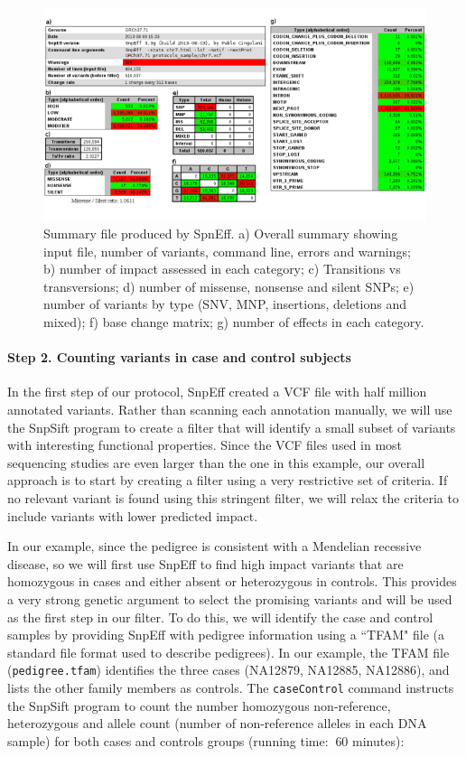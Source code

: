 \begin{figure}
    \centering
    \includegraphics[width=14cm]{snpeff_1.png}
    \caption{Summary file produced by SpnEff. a) Overall summary showing input file, number of variants, command line, errors and warnings; b) number of impact assessed in each category; c) Transitions vs transversions; d) number of missense, nonsense and silent SNPs; e) number of variants by type (SNV, MNP, insertions, deletions and mixed); f) base change matrix; g) number of effects in each category.}
    \label{fig:snpeff1}
\end{figure}

\paragraph{Step 2. Counting variants in case and control subjects} In the first step of our protocol, SnpEff created a VCF file with half million annotated variants. Rather than scanning each annotation manually, we will use the SnpSift program to create a filter that will identify a small subset of variants with interesting functional properties. Since the VCF files used in most sequencing studies are even larger than the one in this example, our overall approach is to start by creating a filter using a very restrictive set of criteria. If no relevant variant is found using this stringent filter, we will relax the criteria to include variants with lower predicted impact.

In our example, since the pedigree is consistent with a Mendelian recessive disease, so we will first use SnpEff to find high impact variants that are homozygous in cases and either absent or heterozygous in controls. This provides a very strong genetic argument to select the promising variants and will be used as the first step in our filter. To do this, we will identify the case and control samples by providing SnpEff with pedigree information using a ``TFAM" file (a standard file format used to describe pedigrees). In our example, the TFAM file (\texttt{pedigree.tfam}) identifies the three cases (NA12879, NA12885, NA12886), and lists the other family members as controls. The \texttt{caseControl} command instructs the SnpSift program to count the number homozygous non-reference, heterozygous and allele count (number of non-reference alleles in each DNA sample) for both cases and controls groups (running time: $~60$ minutes):

